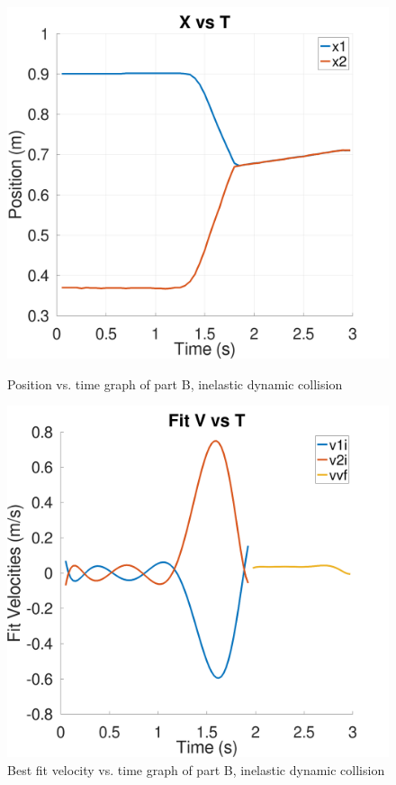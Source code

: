 \documentclass[a4paper, 12pt]{article}
\begin{document}
    \begin{figure}[ht]
        \begin{minipage}{0.35\textwidth}
            \centering
            \includegraphics[width=\linewidth]{./inelastic_dynamic_X.png}
            \caption{Position vs. time graph of part B, inelastic dynamic collision}
            \label{fig:inelastic_dynamic_X}
        \end{minipage}
        \hfill
        \begin{minipage}{0.35\textwidth}
            \centering
            \includegraphics[width=\linewidth]{./inelastic_dynamic_Vfit.png}
            \caption{Best fit velocity vs. time graph of part B, inelastic dynamic collision}
            \label{fig:inelastic_dynamic_V}
        \end{minipage}
    \end{figure}
\end{document}

